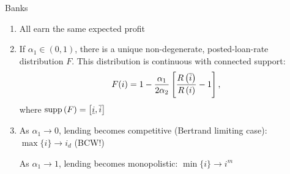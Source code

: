 \documentclass[10pt,english,slidetop,compress,
              blue,mathserif,color=option]{beamer}
\theoremstyle{plain}
\theoremstyle{definition}
\begin{document}
\begin{frame}[allowframebreaks]{Banks}
\begin{enumerate}
\begin{itemize}
      \end{itemize}

      \item All earn the same expected profit
      
      \item If $\alpha_{1} \in (0,1)$, there is a unique non-degenerate, posted-loan-rate distribution $F$. This distribution is continuous with connected support:
      \begin{equation*}
        F\text{\ensuremath{\left(i\right)}}
        =
        1-\frac{\alpha_{1}}{2\alpha_{2}}
        \left[
          \frac{R\left(\overline{i}\right)}{R\left(i\right)}-1
        \right],
        \label{eq:BJ Bank - equilibrium F}
      \end{equation*}
      where %
      $
        \textup{supp}\left(F\right)
          =
        \left[\underline{i},\overline{i}\right]
      $

      \item As $\alpha_{1} \rightarrow 0$, lending becomes competitive (Bertrand limiting case): $\max\{i\} \rightarrow i_{d}$ (BCW!)
      
      As $\alpha_{1} \rightarrow 1$, lending becomes monopolistic: $\min\{i\} \rightarrow i^{m}$

  \end{enumerate}








\end{frame}
\end{document}
